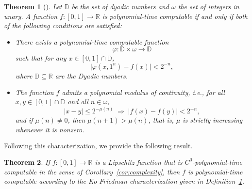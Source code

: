 \documentclass[pdflatex]{sn-jnl}%
\newtheorem{theorem}{Theorem}[section]%
\begin{document}
\begin{theorem}[\cite{Steinberg2017}]\label{thm:comp_L2}
Let $\mathbb{D}$ be the set of dyadic numbers and $\omega$ the set of integers in unary. A function $f \colon [0,1] \to \mathbb{R}$ is polynomial-time computable if and only if both of the following conditions are satisfied:
\begin{itemize}
    \item There exists a polynomial-time computable function
    \[
        \varphi \colon \mathbb{D} \times \omega \to \mathbb{D}
    \]
    such that for any $x \in [0,1] \cap \mathbb{D}$,
    \[
        \lvert \varphi(x,1^n) - f(x) \rvert < 2^{-n},
    \]
    where $\mathbb{D}\subseteq \mathbb{R}$ are the Dyadic numbers. 
    \item The function $f$ admits a polynomial modulus of continuity, i.e., for all $x,y \in [0,1]\cap \mathbb{D}$ and all $n \in \omega$,
\[
|x-y|\le 2^{-\mu(n)} \;\Longrightarrow\; |f(x)-f(y)| < 2^{-n},
\]
and if $\mu(n) \neq 0$, then $\mu(n+1) > \mu(n)$, that is, $\mu$ is strictly
increasing whenever it is nonzero.
\end{itemize}
\end{theorem}
Following this characterization, we provide the following result.
\begin{theorem}\label{thm:equival_compt}
If $f:[0,1]\to\mathbb{R}$ is a Lipschitz function that is $C^0$-polynomial-time computable in the sense of Corollary~\ref{cor:complexity}, then $f$ is polynomial-time computable according to the Ko-Friedman characterization given in Definition~\ref{thm:comp_L2}.
\end{theorem}
\end{document}
